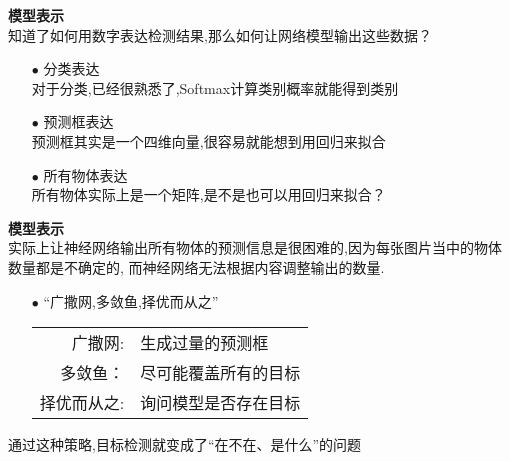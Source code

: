\begin{frame}
    \noindent\large\textbf{模型表示}\\
    \vspace{1em}
    知道了如何用数字表达检测结果,那么如何让网络模型输出这些数据？\\
    \vspace{1em}
    \begin{itemize}
        \item[$ \bullet $] 分类表达\\
            \vspace{0.5em}
            对于分类,已经很熟悉了,Softmax计算类别概率就能得到类别\\
            \vspace{0.5em}
        \item[$ \bullet $] 预测框表达\\
            \vspace{0.5em}
            预测框其实是一个四维向量,很容易就能想到用回归来拟合\\
            \vspace{0.5em}
        \item[$ \bullet $] 所有物体表达\\
            \vspace{0.5em}
            所有物体实际上是一个矩阵,是不是也可以用回归来拟合？\\
            \vspace{0.5em}
    \end{itemize}
\end{frame}

\begin{frame}
    \noindent\large\textbf{模型表示}\\
    \vspace{0.5em}
    实际上让神经网络输出所有物体的预测信息是很困难的,因为每张图片当中的物体数量都是不确定的,
    而神经网络无法根据内容调整输出的数量.  \\
    \vspace{0.5em}
    \begin{itemize}
        \item[$ \bullet $] “广撒网,多敛鱼,择优而从之”
            \begin{tabular}{rl}
                广撒网:     & 生成过量的预测框     \\
                多敛鱼：    & 尽可能覆盖所有的目标 \\
                择优而从之: & 询问模型是否存在目标 \\
            \end{tabular}
    \end{itemize}
    通过这种策略,目标检测就变成了“在不在、是什么”的问题
\end{frame}